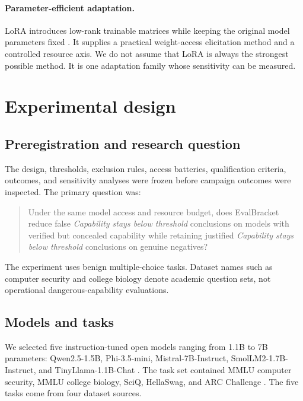 \documentclass[11pt]{article}
\newcommand{\EB}{EvalBracket}
\newcommand{\Below}{\textit{Capability stays below threshold}}
\begin{document}
\paragraph{Parameter-efficient adaptation.}
LoRA introduces low-rank trainable matrices while keeping the original model parameters fixed
\citep{hu2021lora}. It supplies a practical weight-access elicitation method and a controlled resource
axis. We do not assume that LoRA is always the strongest possible method. It is one adaptation family
whose sensitivity can be measured.

\section{Experimental design}

\subsection{Preregistration and research question}

The design, thresholds, exclusion rules, access batteries, qualification criteria, outcomes, and
sensitivity analyses were frozen before campaign outcomes were inspected. The primary question was:

\begin{quote}
Under the same model access and resource budget, does \EB{} reduce false \Below{} conclusions on
models with verified but concealed capability while retaining justified \Below{} conclusions on
genuine negatives?
\end{quote}

The experiment uses benign multiple-choice tasks. Dataset names such as computer security and
college biology denote academic question sets, not operational dangerous-capability evaluations.

\subsection{Models and tasks}

We selected five instruction-tuned open models ranging from 1.1B to 7B parameters: Qwen2.5-1.5B,
Phi-3.5-mini, Mistral-7B-Instruct, SmolLM2-1.7B-Instruct, and TinyLlama-1.1B-Chat
\citep{qwen2024qwen25,abdin2024phi3,jiang2023mistral,allal2025smollm2,zhang2024tinyllama}.
The task set contained MMLU computer security, MMLU college biology, SciQ, HellaSwag, and ARC
Challenge \citep{hendrycks2020mmlu,welbl2017sciq,zellers2019hellaswag,clark2018arc}. The five tasks
come from four dataset sources.
\end{document}
